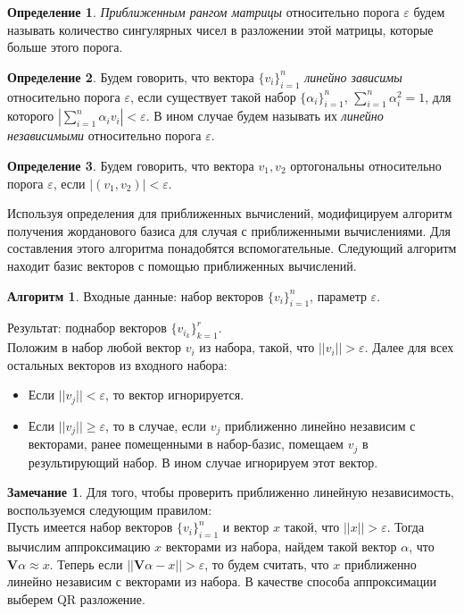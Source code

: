 \documentclass[specialist, substylefile = spbureport.rtx, subf,href,colorlinks=true, 12pt]{disser}
\theoremstyle{definition}
\newtheorem{definition}{Определение}
\newtheorem{algorithm}{Алгоритм}
\newtheorem{remark}{Замечание}
\begin{document}
\begin{definition}
        \textit{Приближенным рангом матрицы} относительно порога $\varepsilon$ будем называть количество сингулярных чисел в разложении этой матрицы, которые больше этого порога.
\end{definition}

\begin{definition}
        Будем говорить, что вектора $\{ v_i \}_{i = 1}^n$ \textit{линейно зависимы} относительно порога $\varepsilon$, если существует такой набор $\{ \alpha_i \}_{i = 1}^n$, $\sum_{i = 1}^n\alpha_i^2=1$, для которого $|\sum_{i = 1}^n \alpha_i v_i| < \varepsilon$. В ином случае будем называть их \textit{линейно независимыми} относительно порога $\varepsilon$.
\end{definition}

\begin{definition}
        Будем говорить, что вектора $v_1, v_2$ ортогональны относительно порога $\varepsilon$, если $|(v_1, v_2)| < \varepsilon$.
\end{definition}

Используя определения для приближенных вычислений, модифицируем алгоритм получения жорданового базиса для случая с приближенными вычислениями. Для составления этого алгоритма понадобятся вспомогательные. Следующий алгоритм находит базис векторов с помощью приближенных вычислений.

\begin{algorithm}
Входные данные: набор векторов $\{ v_i \}_{i = 1}^n$, параметр $\varepsilon$.

Результат: поднабор векторов $\{ v_{i_k}\}_{k = 1}^r$.
\\
Положим в набор любой вектор $v_i$ из набора, такой, что $||v_i|| > \varepsilon$. Далее для всех остальных векторов из входного набора:
\begin{itemize}
    \item Если $||v_j|| < \varepsilon$, то вектор игнорируется.
    \item Если $||v_j|| \geq \varepsilon$, то в случае, если $v_j$ приближенно линейно независим с векторами, ранее помещенными в набор-базис, помещаем $v_j$ в результирующий набор. В ином случае игнорируем этот вектор.
\end{itemize}
\end{algorithm}

\begin{remark}
    Для того, чтобы проверить приближенно линейную независимость, воспользуемся следующим правилом: \\
    Пусть имеется набор векторов $\{ v_i \}_{i = 1}^n$ и вектор $x$ такой, что $||x|| > \varepsilon$. Тогда вычислим аппроксимацию $x$ векторами из набора, найдем такой вектор $\alpha$, что $\mathbf{V}\alpha \approx x$. Теперь если $||\mathbf{V}\alpha - x|| > \varepsilon$, то будем считать, что $x$ приближенно линейно независим с векторами из набора. В качестве способа аппроксимации выберем QR разложение.
\end{remark}
\end{document}

